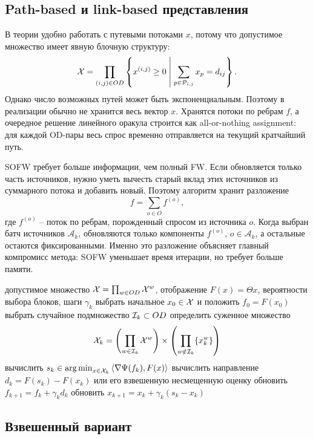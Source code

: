 \subsection{Path-based и link-based представления}

В теории удобно работать с путевыми потоками $x$, потому что допустимое множество имеет
явную блочную структуру:
\[
    \mathcal{X}=\prod_{(i,j)\in OD}
    \left\{
        x^{(i,j)}\geq 0\;\middle|\;
        \sum_{p\in\mathcal{P}_{i,j}}x_p=d_{ij}
    \right\}.
\]
Однако число возможных путей может быть экспоненциальным.
Поэтому в реализации обычно не хранится весь вектор $x$.
Хранятся потоки по ребрам $f$, а очередное решение линейного оракула строится как
all-or-nothing assignment: для каждой OD-пары весь спрос временно отправляется на текущий
кратчайший путь.

SOFW требует больше информации, чем полный FW.
Если обновляется только часть источников, нужно уметь вычесть старый вклад этих источников
из суммарного потока и добавить новый.
Поэтому алгоритм хранит разложение
\[
    f=\sum_{o\in O}f^{(o)},
\]
где $f^{(o)}$ -- поток по ребрам, порожденный спросом из источника $o$.
Когда выбран батч источников $\mathcal A_k$, обновляются только компоненты
$f^{(o)}$, $o\in\mathcal A_k$, а остальные остаются фиксированными.
Именно это разложение объясняет главный компромисс метода: SOFW уменьшает время итерации,
но требует больше памяти.

\begin{algorithm}
\caption{Stochastic Origin Frank--Wolfe}
\label{alg:sofw}
\begin{algorithmic}
\REQUIRE допустимое множество $\mathcal{X}=\prod_{w\in OD}\mathcal{X}^w$, отображение $F(x)=\Theta x$, вероятности выбора блоков, шаги $\gamma_k$
\STATE выбрать начальное $x_0\in\mathcal{X}$ и положить $f_0=F(x_0)$
\STATE выбрать случайное подмножество $\mathcal{I}_k\subset OD$
\STATE определить суженное множество
\[
    \mathcal{X}_k=
    \left(\prod_{w\in\mathcal{I}_k}\mathcal{X}^w\right)
    \times
    \left(\prod_{w\notin\mathcal{I}_k}\{x_k^w\}\right)
\]
\STATE вычислить $s_k\in\operatorname*{arg\,min}_{x\in\mathcal{X}_k}\left\langle \nabla\Psi(f_k), F(x) \right\rangle$
\STATE вычислить направление $d_k=F(s_k)-F(x_k)$ или его взвешенную несмещенную оценку
\STATE обновить $f_{k+1}=f_k+\gamma_kd_k$
\STATE обновить $x_{k+1}=x_k+\gamma_k(s_k-x_k)$
\ENDFOR
\end{algorithmic}
\end{algorithm}

\subsection{Взвешенный вариант}

